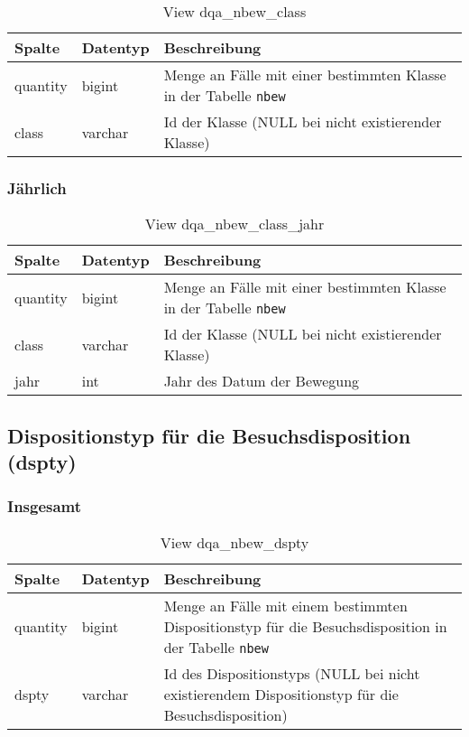 \begin{table}[ht]
	\centering   
	\caption{View dqa\_nbew\_class}
	\label{tab:bewClassI}
	\begin{tabular}{||l|l|p{10cm}||}   		
		\hline
		Spalte & Datentyp & Beschreibung \\ [0.5ex]
		\hline\hline
		quantity & bigint & Menge an Fälle mit einer bestimmten Klasse in der Tabelle \texttt{nbew} \\
		\hline
		class & varchar & Id der Klasse (NULL bei nicht existierender Klasse)\\
		\hline
		
	\end{tabular}
\end{table}
\newpage
\subsubsection{Jährlich} \label{subsubsec:bewClassJ}

\begin{table}[ht]
	\centering   
	\caption{View dqa\_nbew\_class\_jahr}
	\label{tab:bewClassJ}
	\begin{tabular}{||l|l|p{10cm}||}   		
		\hline
		Spalte & Datentyp & Beschreibung \\ [0.5ex]
		\hline\hline
		quantity & bigint & Menge an Fälle mit einer bestimmten Klasse in der Tabelle \texttt{nbew}\\
		\hline
		class & varchar & Id der Klasse (NULL bei nicht existierender Klasse)\\
		\hline
		jahr & int &  Jahr des Datum der Bewegung \\
		\hline		
	\end{tabular}
\end{table}

\subsection{Dispositionstyp für die Besuchsdisposition (dspty)} \label{subsec:bewdspty}

\subsubsection{Insgesamt} \label{subsubsec:bewDsptyI}

\begin{table}[ht]
	\centering   
	\caption{View dqa\_nbew\_dspty}
	\label{tab:bewDsptyI}
	\begin{tabular}{||l|l|p{10cm}||}   		
		\hline
		Spalte & Datentyp & Beschreibung \\ [0.5ex]
		\hline\hline
		quantity & bigint & Menge an Fälle mit einem bestimmten Dispositionstyp für die Besuchsdisposition in der Tabelle \texttt{nbew} \\
		\hline
		dspty & varchar & Id des Dispositionstyps (NULL bei nicht existierendem Dispositionstyp für die Besuchsdisposition)\\
		\hline
		
	\end{tabular}
\end{table}

